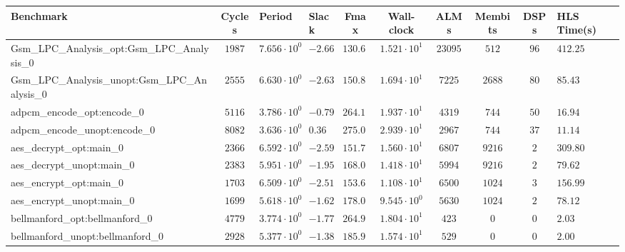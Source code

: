 \begin{tabular}{|l|c|HHc|c|c|c|cH|}
\hline
Benchmark                                       & Cycles       & Period                 & Slack     & Fmax       & Wall-clock              & ALMs       & Membits     & DSPs    & HLS Time(s) \\
\hline
Gsm\_LPC\_Analysis\_opt:Gsm\_LPC\_Analysis\_0   & $ 1987     $ & $ 7.656 \cdot 10^{0} $ & $ -2.66 $ & $ 130.62 $ & $ 1.521 \cdot 10^{1}  $ & $ 23095  $ & $ 512     $ & $ 96  $ & $ 412.25  $ \\
Gsm\_LPC\_Analysis\_unopt:Gsm\_LPC\_Analysis\_0 & $ 2555     $ & $ 6.630 \cdot 10^{0} $ & $ -2.63 $ & $ 150.83 $ & $ 1.694 \cdot 10^{1}  $ & $ 7225   $ & $ 2688    $ & $ 80  $ & $ 85.43   $ \\
adpcm\_encode\_opt:encode\_0                    & $ 5116     $ & $ 3.786 \cdot 10^{0} $ & $ -0.79 $ & $ 264.13 $ & $ 1.937 \cdot 10^{1}  $ & $ 4319   $ & $ 744     $ & $ 50  $ & $ 16.94   $ \\
adpcm\_encode\_unopt:encode\_0                  & $ 8082     $ & $ 3.636 \cdot 10^{0} $ & $ 0.36  $ & $ 275.03 $ & $ 2.939 \cdot 10^{1}  $ & $ 2967   $ & $ 744     $ & $ 37  $ & $ 11.14   $ \\
aes\_decrypt\_opt:main\_0                       & $ 2366     $ & $ 6.592 \cdot 10^{0} $ & $ -2.59 $ & $ 151.70 $ & $ 1.560 \cdot 10^{1}  $ & $ 6807   $ & $ 9216    $ & $ 2   $ & $ 309.80  $ \\
aes\_decrypt\_unopt:main\_0                     & $ 2383     $ & $ 5.951 \cdot 10^{0} $ & $ -1.95 $ & $ 168.04 $ & $ 1.418 \cdot 10^{1}  $ & $ 5994   $ & $ 9216    $ & $ 2   $ & $ 79.62   $ \\
aes\_encrypt\_opt:main\_0                       & $ 1703     $ & $ 6.509 \cdot 10^{0} $ & $ -2.51 $ & $ 153.63 $ & $ 1.108 \cdot 10^{1}  $ & $ 6500   $ & $ 1024    $ & $ 3   $ & $ 156.99  $ \\
aes\_encrypt\_unopt:main\_0                     & $ 1699     $ & $ 5.618 \cdot 10^{0} $ & $ -1.62 $ & $ 178.00 $ & $ 9.545 \cdot 10^{0}  $ & $ 5630   $ & $ 1024    $ & $ 2   $ & $ 78.12   $ \\
bellmanford\_opt:bellmanford\_0                 & $ 4779     $ & $ 3.774 \cdot 10^{0} $ & $ -1.77 $ & $ 264.97 $ & $ 1.804 \cdot 10^{1}  $ & $ 423    $ & $ 0       $ & $ 0   $ & $ 2.03    $ \\
bellmanford\_unopt:bellmanford\_0               & $ 2928     $ & $ 5.377 \cdot 10^{0} $ & $ -1.38 $ & $ 185.98 $ & $ 1.574 \cdot 10^{1}  $ & $ 529    $ & $ 0       $ & $ 0   $ & $ 2.00    $ \\

\end{tabular}
